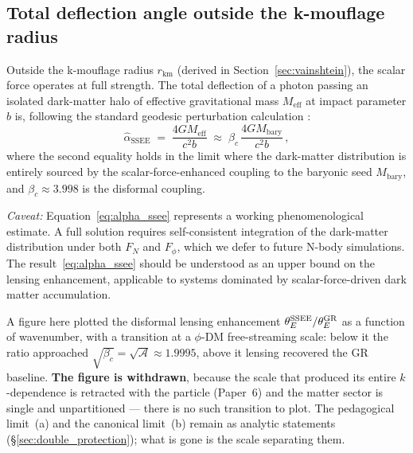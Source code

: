 \documentclass[12pt,a4paper]{article}
\newcommand{\bc}{\beta_c}
\newcommand{\rV}{r_{\mathrm{km}}}
\newcommand{\hatalf}{\hat{\alpha}}
\begin{document}
\subsection{Total deflection angle outside the k-mouflage radius}

Outside the k-mouflage radius $\rV$ (derived in
Section~\ref{sec:vainshtein}), the scalar force operates at full strength.
The total deflection of a photon passing an isolated dark-matter halo of
effective gravitational mass $M_{\mathrm{eff}}$ at impact parameter $b$
is, following the standard geodesic perturbation calculation
\citep{will1993,bartelmann2001}:
\begin{equation}
  \hatalf_{\mathrm{SSEE}} \;=\; \frac{4GM_{\mathrm{eff}}}{c^2 b}
                           \;\approx\; \bc\,\frac{4GM_{\mathrm{bary}}}{c^2 b}\,,
  \label{eq:alpha_ssee}
\end{equation}
where the second equality holds in the limit where the dark-matter
distribution is entirely sourced by the scalar-force-enhanced coupling to
the baryonic seed $M_{\mathrm{bary}}$, and $\bc \approx 3.998$ is the
disformal coupling.

\textit{Caveat:} Equation~\eqref{eq:alpha_ssee} represents a working
phenomenological estimate.
A full solution requires self-consistent integration of the dark-matter
distribution under both $F_N$ and $F_\phi$, which we defer to future
N-body simulations.
The result~\eqref{eq:alpha_ssee} should be understood as an upper bound on
the lensing enhancement, applicable to systems dominated by scalar-force-driven
dark matter accumulation.

\begin{tcolorbox}[colback=orange!5,colframe=orange!60!black,title=Figure withdrawn]
A figure here plotted the disformal lensing enhancement
$\theta_E^{\rm SSEE}/\theta_E^{\rm GR}$ as a function of wavenumber, with a
transition at a $\phi$-DM free-streaming scale: below it the ratio approached
$\sqrt{\bc}=\sqrt{\mathcal{A}}\approx1.9995$, above it lensing recovered the GR
baseline. \textbf{The figure is withdrawn}, because the scale that produced its
entire $k$-dependence is retracted with the particle (Paper~6) and the matter
sector is single and unpartitioned --- there is no such transition to plot. The
pedagogical limit~(a) and the canonical limit~(b) remain as analytic statements
(\S\ref{sec:double_protection}); what is gone is the scale separating them.
\end{tcolorbox}

\end{document}

